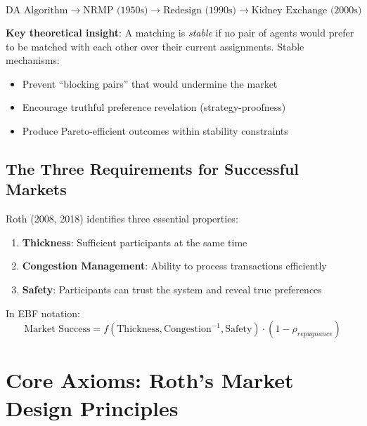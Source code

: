 \begin{equation}
\text{DA Algorithm} \rightarrow \text{NRMP (1950s)} \rightarrow \text{Redesign (1990s)} \rightarrow \text{Kidney Exchange (2000s)}
\end{equation}

\textbf{Key theoretical insight}: A matching is \textit{stable} if no pair of agents would prefer to be matched with each other over their current assignments. Stable mechanisms:

\begin{itemize}
    \item Prevent ``blocking pairs'' that would undermine the market
    \item Encourage truthful preference revelation (strategy-proofness)
    \item Produce Pareto-efficient outcomes within stability constraints
\end{itemize}

\subsection{The Three Requirements for Successful Markets}

Roth (2008, 2018) identifies three essential properties:

\begin{tcolorbox}[colback=yellow!5!white,colframe=yellow!75!black,title=Roth's Market Design Triangle]
\begin{enumerate}
    \item \textbf{Thickness}: Sufficient participants at the same time
    \item \textbf{Congestion Management}: Ability to process transactions efficiently
    \item \textbf{Safety}: Participants can trust the system and reveal true preferences
\end{enumerate}
\end{tcolorbox}

In EBF notation:
\begin{equation}
\text{Market Success} = f(\text{Thickness}, \text{Congestion}^{-1}, \text{Safety}) \cdot (1 - \rho_{repugnance})
\end{equation}

\section{Core Axioms: Roth's Market Design Principles}


